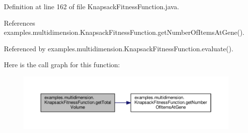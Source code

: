 Definition at line 162 of file Knapsack\-Fitness\-Function.\-java.



References examples.\-multidimension.\-Knapsack\-Fitness\-Function.\-get\-Number\-Of\-Items\-At\-Gene().



Referenced by examples.\-multidimension.\-Knapsack\-Fitness\-Function.\-evaluate().



Here is the call graph for this function\-:
\nopagebreak
\begin{figure}[H]
\begin{center}
\leavevmode
\includegraphics[width=350pt]{classexamples_1_1multidimension_1_1_knapsack_fitness_function_a84ed0b4fd5a23d410ea9e2f79397f07b_cgraph}
\end{center}
\end{figure}


